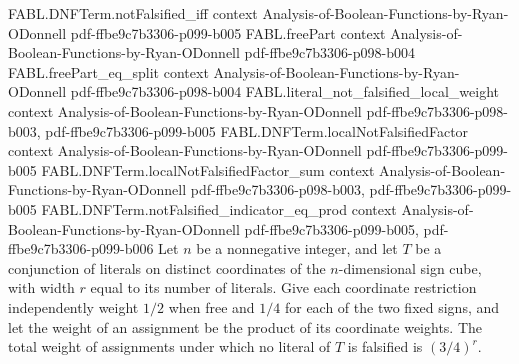 \begin{theorem}
\proofstep
  {FABL.DNFTerm.notFalsified_iff}
  {context}
  {Analysis-of-Boolean-Functions-by-Ryan-ODonnell}
  {pdf-ffbe9c7b3306-p099-b005}
\proofstep
  {FABL.freePart}
  {context}
  {Analysis-of-Boolean-Functions-by-Ryan-ODonnell}
  {pdf-ffbe9c7b3306-p098-b004}
\proofstep
  {FABL.freePart_eq_split}
  {context}
  {Analysis-of-Boolean-Functions-by-Ryan-ODonnell}
  {pdf-ffbe9c7b3306-p098-b004}
\proofstep
  {FABL.literal_not_falsified_local_weight}
  {context}
  {Analysis-of-Boolean-Functions-by-Ryan-ODonnell}
  {pdf-ffbe9c7b3306-p098-b003,
    pdf-ffbe9c7b3306-p099-b005}
\proofstep
  {FABL.DNFTerm.localNotFalsifiedFactor}
  {context}
  {Analysis-of-Boolean-Functions-by-Ryan-ODonnell}
  {pdf-ffbe9c7b3306-p099-b005}
\proofstep
  {FABL.DNFTerm.localNotFalsifiedFactor_sum}
  {context}
  {Analysis-of-Boolean-Functions-by-Ryan-ODonnell}
  {pdf-ffbe9c7b3306-p098-b003,
    pdf-ffbe9c7b3306-p099-b005}
\proofstep
  {FABL.DNFTerm.notFalsified_indicator_eq_prod}
  {context}
  {Analysis-of-Boolean-Functions-by-Ryan-ODonnell}
  {pdf-ffbe9c7b3306-p099-b005,
    pdf-ffbe9c7b3306-p099-b006}
Let $n$ be a nonnegative integer, and let $T$ be a conjunction of literals on distinct
coordinates of the $n$-dimensional sign cube, with width $r$ equal to its number of
literals. Give each coordinate restriction independently weight $1/2$ when free and
$1/4$ for each of the two fixed signs, and let the weight of an assignment be the
product of its coordinate weights. The total weight of assignments under which no
literal of $T$ is falsified is $(3/4)^r$.
\end{theorem}

